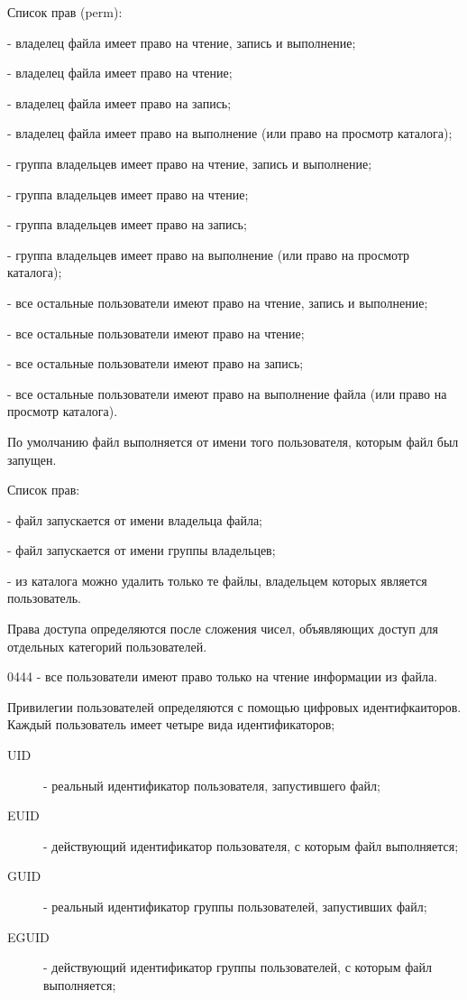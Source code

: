 \begin{keylist}{Список прав (perm):}
  
   - владелец файла имеет право на чтение, запись и выполнение; 
  
   - владелец файла имеет право на чтение;
  
   - владелец файла имеет право на запись; 
  
   - владелец файла имеет право на выполнение (или право на просмотр каталога); 
  
   - группа владельцев имеет право на чтение, запись и выполнение; 
  
   - группа владельцев имеет право на чтение; 
  
   - группа владельцев имеет право на запись; 
  
   - группа владельцев имеет право на выполнение (или право на просмотр каталога); 
  
   - все остальные пользователи имеют право на чтение, запись и выполнение; 
  
   - все остальные пользователи имеют право на чтение; 
  
   - все остальные пользователи имеют право на запись; 
  
   - все остальные пользователи имеют право на выполнение файла (или право на просмотр каталога).
\end{keylist}

По умолчанию файл выполняется от имени того пользователя, которым файл был запущен. 
\begin{keylist}{Список прав:}
  
   - файл запускается от имени владельца файла; 
  
   - файл запускается от имени группы владельцев; 
  
   - из каталога можно удалить только те файлы, владельцем которых является пользователь.
\end{keylist}

Права доступа определяются после сложения чисел, объявляющих доступ для отдельных категорий пользователей. 

0444 - все пользователи имеют право только на чтение информации из файла. 

Привилегии пользователей определяются с помощью цифровых идентифкаиторов. Каждый пользователь имеет четыре вида идентификаторов;

\begin{description} 
  \item[UID] - реальный идентификатор пользователя, запустившего файл;
  \item[EUID] - действующий идентификатор пользователя, с которым файл выполняется;
  \item[GUID] - реальный идентификатор группы пользователей, запустивших файл;
  \item[EGUID] - действующий идентификатор группы пользователей, с которым файл выполняется;
\end{description}

